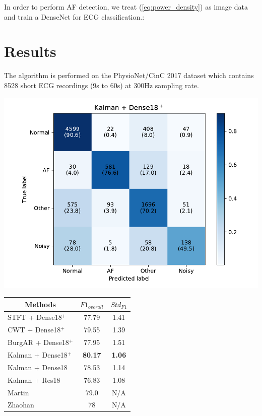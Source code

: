 \documentclass[portrait,a0,final]{a0poster} %
\begin{document}
\begin{minipage}{0.98\linewidth}
\begin{minipage}[t]{0.47\linewidth}
In order to perform AF detection, we treat (\ref{eq:power_density}) as image data and train a DenseNet for ECG classification.:

\section*{Results}
The algorithm is performed on the PhysioNet/CinC 2017 dataset which contains 8528 short ECG recordings (9s to 60s) at 300Hz sampling rate. 

\begin{minipage}[t]{\linewidth}
\begin{minipage}[t]{0.48\linewidth}
	\centering
	\includegraphics[width=0.95\linewidth,trim=1.17cm 0.4cm 3.35cm 0cm,clip]{figures/cm_kalman}
\end{minipage}
\begin{minipage}[t]{0.48\linewidth}
	\vspace{-14cm}
\large
\begin{tabular}{|l|c|c|}
	\hline
	 \multicolumn{1}{|c|}{Methods}           & $F1_{overall}$  & $Std_{F1}$ \\ \hline
	 STFT + Dense18$^+$                          & 77.79          & 1.41       \\ \hline
	 CWT + Dense18$^+$                           & 79.55          & 1.39      \\ \hline
	 BurgAR + Dense18$^+$                         & 77.95          & 1.51       \\ \hline
	 Kalman + Dense18$^+$                        & \textbf{80.17} & \textbf{1.06}       \\ \hline
	 Kalman + Dense18                       & 78.53          & 1.14      \\ \hline
	 Kalman + Res18                         & 76.83          & 1.08       \\ \hline
	 Martin & 79.0            & N/A         \\ \hline
	 Zhaohan                                & 78              & N/A         \\ \hline
\end{tabular}
\end{minipage}
\end{minipage}


\end{minipage}
\end{minipage}
\end{document}
